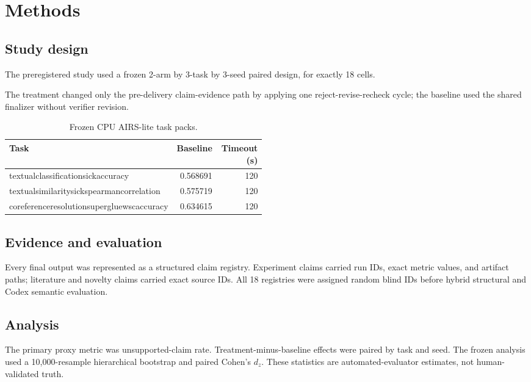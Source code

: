 \documentclass[11pt]{article}
\begin{document}
\section{Methods}
\subsection{Study design}
The preregistered study used a frozen 2-arm by 3-task by 3-seed paired design, for exactly 18 cells.

The treatment changed only the pre-delivery claim-evidence path by applying one reject-revise-recheck cycle; the baseline used the shared finalizer without verifier revision.

\begin{table}[htbp]
\centering\small
\caption{Frozen CPU AIRS-lite task packs.}
\begin{tabular}{p{0.49\linewidth}rr}
\toprule
Task & Baseline & Timeout (s) \\
\midrule
textualclassificationsickaccuracy & 0.568691 & 120 \\
textualsimilaritysickspearmancorrelation & 0.575719 & 120 \\
coreferenceresolutionsupergluewscaccuracy & 0.634615 & 120 \\
\bottomrule
\end{tabular}
\end{table}
\subsection{Evidence and evaluation}
Every final output was represented as a structured claim registry. Experiment claims carried run IDs, exact metric values, and artifact paths; literature and novelty claims carried exact source IDs. All 18 registries were assigned random blind IDs before hybrid structural and Codex semantic evaluation.
\subsection{Analysis}
The primary proxy metric was unsupported-claim rate. Treatment-minus-baseline effects were paired by task and seed. The frozen analysis used a 10,000-resample hierarchical bootstrap and paired Cohen's $d_z$. These statistics are automated-evaluator estimates, not human-validated truth.
\end{document}
